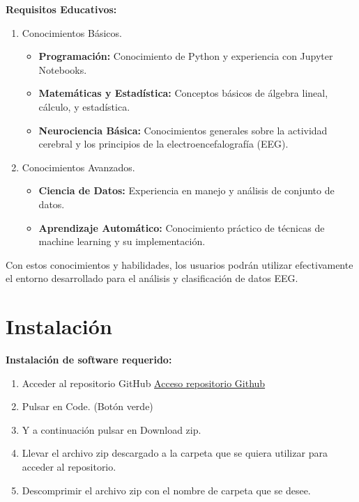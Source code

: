 \textbf{Requisitos Educativos:} 

\begin{enumerate}
\def\labelenumi{\arabic{enumi}.}
\tightlist
\item Conocimientos Básicos.
  \begin{itemize}
   \tightlist
   \item
    \textbf{Programación:} Conocimiento de Python y experiencia con Jupyter Notebooks.
   \item
   \textbf{Matemáticas y Estadística: } Conceptos básicos de álgebra lineal, cálculo, y estadística.
   \item
   \textbf{Neurociencia Básica: }  Conocimientos generales sobre la actividad cerebral y los principios de la electroencefalografía (EEG).
  \end{itemize}
\item Conocimientos Avanzados.
  \begin{itemize}
   \tightlist
   \item
    \textbf{Ciencia de Datos:} Experiencia en manejo y análisis de conjunto de datos.
   \item
   \textbf{Aprendizaje Automático:  } Conocimiento práctico de técnicas de machine learning y su implementación.
  \end{itemize}
\end{enumerate} 
Con estos conocimientos y habilidades, los usuarios podrán utilizar efectivamente el entorno desarrollado para el análisis y clasificación de datos EEG.    
   


\section{Instalación}

\textbf{Instalación de software requerido:} 

\begin{enumerate}
\def\labelenumi{\arabic{enumi}.}
\tightlist
\item Acceder al repositorio GitHub \href{https://github.com/jpg1003/GII_O_MA_23.37}{Acceso repositorio Github}
\item Pulsar en Code. (Botón verde)
\item Y a continuación pulsar en Download zip.


\item Llevar el archivo zip descargado a la carpeta que se quiera utilizar para acceder al repositorio.
\item Descomprimir el archivo zip con el nombre de carpeta que se desee.

\end{enumerate}

